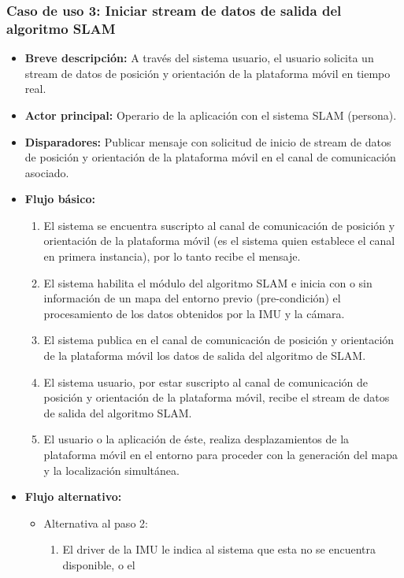 \documentclass[12pt,a4paper, twosite]{article}
\begin{document}
\subsubsection*{Caso de uso 3: Iniciar stream de datos de salida del algoritmo SLAM}

\begin{itemize}
  \item \textbf{Breve descripción:} A través del sistema usuario, el usuario solicita un
  stream de datos de posición y orientación de la plataforma móvil en tiempo real.
  \item \textbf{Actor principal:} Operario de la aplicación con el sistema SLAM (persona).
  \item \textbf{Disparadores:} Publicar mensaje con solicitud de inicio de stream de datos de
  posición y orientación de la plataforma móvil en el canal de comunicación asociado.
  \item \textbf{Flujo básico:}
  \begin{enumerate}
    \item El sistema se encuentra suscripto al canal de comunicación de posición y orientación
    de la plataforma móvil (es el sistema quien establece el canal en primera instancia), por
    lo tanto recibe el mensaje.
    \item El sistema habilita el módulo del algoritmo SLAM e inicia con o sin información de un
    mapa del entorno previo (pre-condición) el procesamiento de los datos obtenidos por la IMU y
    la cámara.
    \item El sistema publica en el canal de comunicación de posición y orientación de la
    plataforma móvil los datos de salida del algoritmo de SLAM.
    \item El sistema usuario, por estar suscripto al canal de comunicación de posición y
    orientación de la plataforma móvil, recibe el stream de datos de salida del algoritmo SLAM.
    \item El usuario o la aplicación de éste, realiza desplazamientos de la plataforma móvil en
    el entorno para proceder con la generación del mapa y la localización simultánea.
  \end{enumerate}
  \item \textbf{Flujo alternativo:}
  \begin{itemize}
    \item Alternativa al paso 2: 
    \begin{enumerate}
      \item El driver de la IMU le indica al sistema que esta no se encuentra disponible, o el

\end{enumerate}
\end{itemize}
\end{itemize}
\end{document}
